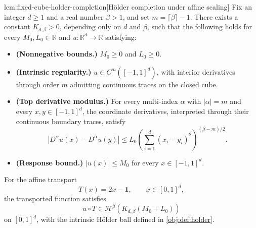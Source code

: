 \begin{lemmav}{lem:fixed-cube-holder-completion}[Hölder completion under affine scaling]
Fix an integer \(d\ge 1\) and a real number \(\beta>1\), and set \(m=\lceil\beta\rceil-1\). There exists a constant \(K_{d,\beta}>0\), depending only on \(d\) and \(\beta\), such that the following holds for every \(M_0,L_0\in\mathbb R\) and \(u:\mathbb R^d\to\mathbb R\) satisfying:
\begin{itemize}
\item \textbf{(Nonnegative bounds.)} \(M_0\ge0\) and \(L_0\ge0\).
\item \textbf{(Intrinsic regularity.)} \(u\in C^m([-1,1]^d)\), with interior derivatives through order \(m\) admitting continuous traces on the closed cube.
\item \textbf{(Top derivative modulus.)} For every multi-index \(\alpha\) with \(|\alpha|=m\) and every \(x,y\in[-1,1]^d\), the coordinate derivatives, interpreted through their continuous boundary traces, satisfy
\[
|D^\alpha u(x)-D^\alpha u(y)|
\le L_0\left(\sum_{i=1}^d(x_i-y_i)^2\right)^{(\beta-m)/2}.
\]
\item \textbf{(Response bound.)} \(|u(x)|\le M_0\) for every \(x\in[-1,1]^d\).
\end{itemize}
For the affine transport
\[
T(x)=2x-\mathbf1,\qquad x\in[0,1]^d,
\]
the transported function satisfies
\[
u\circ T\in\mathcal H^\beta\!\left(K_{d,\beta}(M_0+L_0)\right)
\]
on \([0,1]^d\), with the intrinsic Hölder ball defined in \cref{obj:def:holder}.
\end{lemmav}

